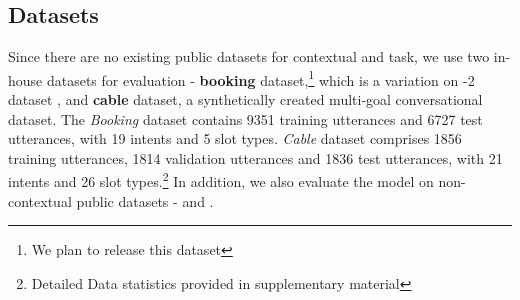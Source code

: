 \subsection{Datasets}
\label{sec:dataset_f}

Since there are no existing public datasets for contextual  and  task, we use two in-house datasets for evaluation - \textbf{booking} dataset,\footnote{We plan to release this dataset} which is a variation on -2 dataset \cite{williams2014dialog}, and \textbf{cable} dataset, a synthetically created multi-goal conversational dataset. 
The \emph{Booking} dataset contains 9351 training utterances and 6727 test utterances, with 19 intents and 5 slot types. \emph{Cable} dataset comprises 1856 training utterances, 1814 validation utterances and 1836 test utterances, with 21 intents and 26 slot types.\footnote{Detailed Data statistics provided in supplementary material}
In addition, we also evaluate the model on non-contextual  public datasets -  \cite{hemphill90} and  \cite{coucke2018snips}.

